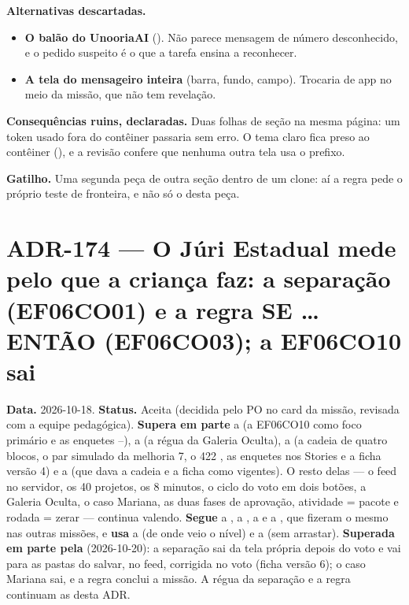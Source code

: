 \textbf{Alternativas descartadas.}

\begin{itemize}
  \item \textbf{O balão do UnooriaAI} (). Não parece mensagem de
    número desconhecido, e o pedido suspeito é o que a tarefa ensina a
    reconhecer.
  \item \textbf{A tela do mensageiro inteira} (barra, fundo, campo). Trocaria
    de app no meio da missão, que não tem revelação.
\end{itemize}

\textbf{Consequências ruins, declaradas.} Duas folhas de seção na mesma página:
um token  usado fora do contêiner passaria sem erro. O tema claro
fica preso ao contêiner (), e a revisão confere que nenhuma
outra tela usa o prefixo.

\textbf{Gatilho.} Uma segunda peça de outra seção dentro de um clone: aí a
regra pede o próprio teste de fronteira, e não só o desta peça.

\section{ADR-174 --- O Júri Estadual mede pelo que a criança faz: a separação (EF06CO01) e a regra SE … ENTÃO (EF06CO03); a EF06CO10 sai}
\label{adr:exp06ef1b-canal-a}

\textbf{Data.} 2026-10-18. \textbf{Status.} Aceita (decidida pelo PO no card da
missão, revisada com a equipe pedagógica). \textbf{Supera em parte} a
 (a EF06CO10 como foco primário e as enquetes --),
a  (a régua da Galeria Oculta), a  (a cadeia de
quatro blocos, o par simulado da melhoria 7, o 422 , as
enquetes nos Stories e a ficha versão 4) e a  (que dava a cadeia
e a ficha como vigentes). O resto delas --- o feed no servidor, os 40 projetos,
os 8 minutos, o ciclo do voto em dois botões, a Galeria Oculta, o caso Mariana,
as duas fases de aprovação, atividade = pacote e rodada = zerar --- continua
valendo. \textbf{Segue} a , a , a  e
a , que fizeram o mesmo nas outras missões, e \textbf{usa} a
 (de onde veio o nível) e a  (sem arrastar).
\textbf{Superada em parte pela } (2026-10-20): a separação sai da
tela própria depois do voto e vai para as pastas do salvar, no feed, corrigida
no voto (ficha versão 6); o caso Mariana sai, e a regra conclui a missão. A
régua da separação e a regra continuam as desta ADR.

